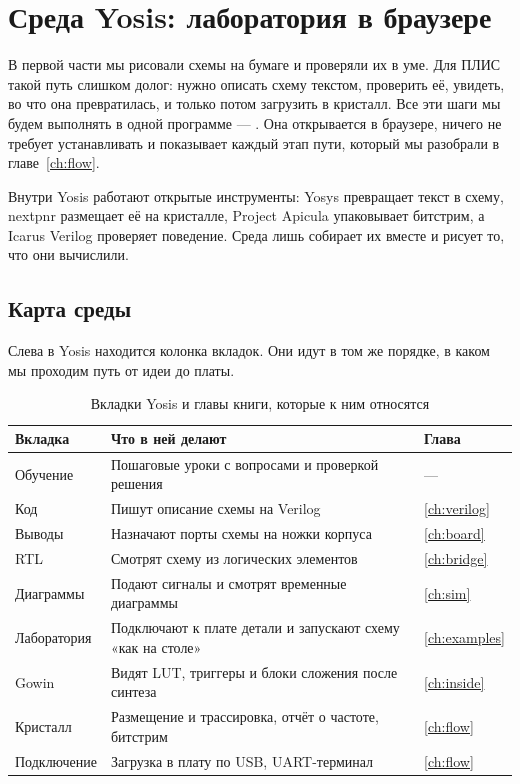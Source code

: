 \chapter{Среда Yosis: лаборатория в браузере}
\label{ch:yosis}

В первой части мы рисовали схемы на бумаге и проверяли их в уме. Для ПЛИС
такой путь слишком долог: нужно описать схему текстом, проверить её, увидеть,
во что она превратилась, и только потом загрузить в кристалл. Все эти шаги мы
будем выполнять в одной программе --- . Она открывается в
браузере, ничего не требует устанавливать и показывает каждый этап пути,
который мы разобрали в главе~\ref{ch:flow}.

Внутри Yosis работают открытые инструменты: Yosys превращает текст в схему,
nextpnr размещает её на кристалле, Project Apicula упаковывает битстрим, а
Icarus Verilog проверяет поведение. Среда лишь собирает их вместе и рисует то,
что они вычислили.

\section{Карта среды}

Слева в Yosis находится колонка вкладок. Они идут в том же порядке, в каком
мы проходим путь от идеи до платы.

\begin{table}[H]
\centering
\caption{Вкладки Yosis и главы книги, которые к ним относятся}
\small
\begin{tabularx}{\textwidth}{l X l}
\toprule
\textbf{Вкладка} & \textbf{Что в ней делают} & \textbf{Глава} \\
\midrule
Обучение & Пошаговые уроки с вопросами и проверкой решения & --- \\
Код & Пишут описание схемы на Verilog & \ref{ch:verilog} \\
Выводы & Назначают порты схемы на ножки корпуса & \ref{ch:board} \\
RTL & Смотрят схему из логических элементов & \ref{ch:bridge} \\
Диаграммы & Подают сигналы и смотрят временные диаграммы & \ref{ch:sim} \\
Лаборатория & Подключают к плате детали и запускают схему «как на столе» & \ref{ch:examples} \\
Gowin & Видят LUT, триггеры и блоки сложения после синтеза & \ref{ch:inside} \\
Кристалл & Размещение и трассировка, отчёт о частоте, битстрим & \ref{ch:flow} \\
Подключение & Загрузка в плату по USB, UART-терминал & \ref{ch:flow} \\
\bottomrule
\end{tabularx}
\end{table}

